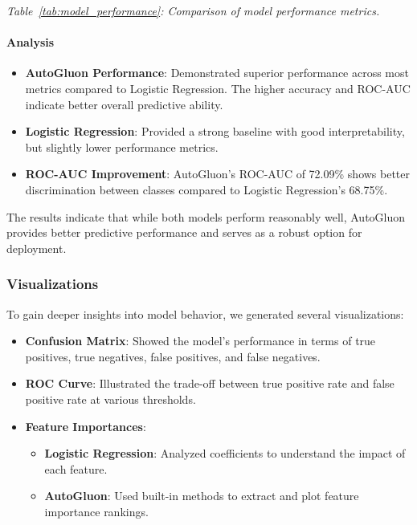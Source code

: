 \documentclass{article}
\begin{document}
\textit{Table~\ref{tab:model_performance}: Comparison of model performance metrics.}

\paragraph{Analysis}

\begin{itemize}[leftmargin=*]
    \item \textbf{AutoGluon Performance}: Demonstrated superior performance across most metrics compared to Logistic Regression. The higher accuracy and ROC-AUC indicate better overall predictive ability.
    \item \textbf{Logistic Regression}: Provided a strong baseline with good interpretability, but slightly lower performance metrics.
    \item \textbf{ROC-AUC Improvement}: AutoGluon's ROC-AUC of 72.09\% shows better discrimination between classes compared to Logistic Regression's 68.75\%.
\end{itemize}

The results indicate that while both models perform reasonably well, AutoGluon provides better predictive performance and serves as a robust option for deployment.

\subsubsection{Visualizations}

To gain deeper insights into model behavior, we generated several visualizations:

\begin{itemize}[leftmargin=*]
    \item \textbf{Confusion Matrix}: Showed the model's performance in terms of true positives, true negatives, false positives, and false negatives.
    \item \textbf{ROC Curve}: Illustrated the trade-off between true positive rate and false positive rate at various thresholds.
    \item \textbf{Feature Importances}:
        \begin{itemize}[leftmargin=*]
            \item \textbf{Logistic Regression}: Analyzed coefficients to understand the impact of each feature.
            \item \textbf{AutoGluon}: Used built-in methods to extract and plot feature importance rankings.
        \end{itemize}
\end{itemize}
\end{document}
